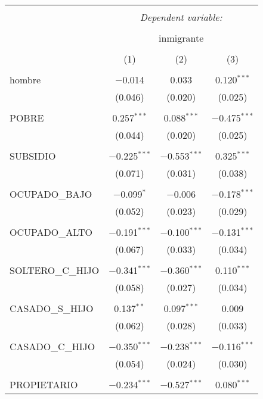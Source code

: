 \documentclass[10pt,a4paper]{book}
\begin{document}
\begin{table}[!htbp] \centering 
  \caption{} 
  \label{} 
\small 
\begin{tabular}{@{\extracolsep{5pt}}lccc} 
\\[-1.8ex]\hline 
\hline \\[-1.8ex] 
 & \multicolumn{3}{c}{\textit{Dependent variable:}} \\ 
\cline{2-4} 
\\[-1.8ex] & \multicolumn{3}{c}{inmigrante} \\ 
\\[-1.8ex] & (1) & (2) & (3)\\ 
\hline \\[-1.8ex] 
 hombre & $-$0.014 & 0.033 & 0.120$^{***}$ \\ 
  & (0.046) & (0.020) & (0.025) \\ 
  & & & \\ 
 POBRE & 0.257$^{***}$ & 0.088$^{***}$ & $-$0.475$^{***}$ \\ 
  & (0.044) & (0.020) & (0.025) \\ 
  & & & \\ 
 SUBSIDIO & $-$0.225$^{***}$ & $-$0.553$^{***}$ & 0.325$^{***}$ \\ 
  & (0.071) & (0.031) & (0.038) \\ 
  & & & \\ 
 OCUPADO\_BAJO & $-$0.099$^{*}$ & $-$0.006 & $-$0.178$^{***}$ \\ 
  & (0.052) & (0.023) & (0.029) \\ 
  & & & \\ 
 OCUPADO\_ALTO & $-$0.191$^{***}$ & $-$0.100$^{***}$ & $-$0.131$^{***}$ \\ 
  & (0.067) & (0.033) & (0.034) \\ 
  & & & \\ 
 SOLTERO\_C\_HIJO & $-$0.341$^{***}$ & $-$0.360$^{***}$ & 0.110$^{***}$ \\ 
  & (0.058) & (0.027) & (0.034) \\ 
  & & & \\ 
 CASADO\_S\_HIJO & 0.137$^{**}$ & 0.097$^{***}$ & 0.009 \\ 
  & (0.062) & (0.028) & (0.033) \\ 
  & & & \\ 
 CASADO\_C\_HIJO & $-$0.350$^{***}$ & $-$0.238$^{***}$ & $-$0.116$^{***}$ \\ 
  & (0.054) & (0.024) & (0.030) \\ 
  & & & \\ 
 PROPIETARIO & $-$0.234$^{***}$ & $-$0.527$^{***}$ & 0.080$^{***}$ \\ 

\end{tabular}
\end{table}
\end{document}
